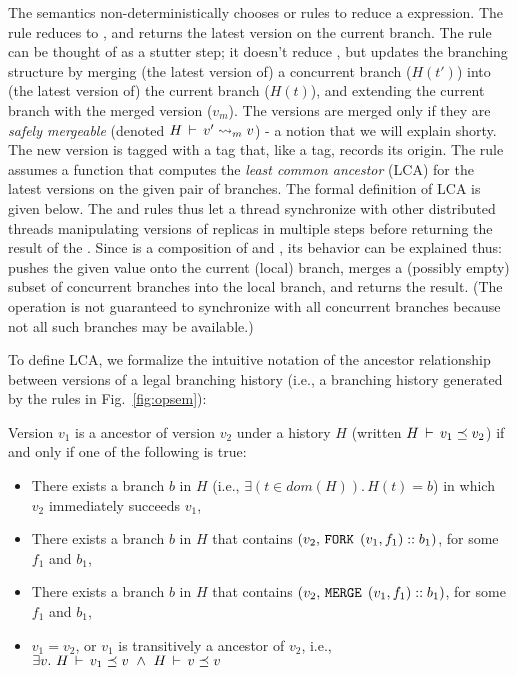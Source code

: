 The semantics non-deterministically chooses  or
 rules to reduce a  expression. The
 rule reduces  to \C{()}, and returns the
latest version on the current branch. The  rule
can be thought of as a stutter step; it doesn't reduce , but
updates the branching structure by merging (the latest version of) a
concurrent branch ($H(t')$) into (the latest version of) the current
branch ($H(t)$), and extending the current branch with the merged
version ($v_m$). The versions are merged only if they are \emph{safely
mergeable} (denoted $H\,\vdash\,v' \rightsquigarrow_m v$) - a notion that we will
explain shorty. The new version is tagged with a  tag that,
like a  tag, records its origin. The rule assumes a function
 that computes the \emph{least common ancestor} (LCA) for the
latest versions on the given pair of branches. The formal definition
of LCA is given below. The  and
 rules thus let a thread synchronize with other
distributed threads manipulating versions of replicas in multiple
steps before returning the result of the . Since  is a
composition of  and , its behavior can be explained
thus:  pushes the given value onto the current (local) branch,
merges a (possibly empty) subset of concurrent branches into the local
branch, and returns the result.  (The operation is not guaranteed to
synchronize with all concurrent branches because not all such branches
may be available.)

To define LCA, we formalize the intuitive notation of the ancestor
relationship between versions of a legal branching history (i.e., a
branching history generated by the rules in Fig.~\ref{fig:opsem}):

\begin{definition} 
Version $v_1$ is a ancestor of version $v_2$ under a history
$H$ (written $H\,\vdash\,v_1 \preceq v_2$) if and only if one of the
following is true:
\begin{itemize}
  \item There exists a branch $b$ in $H$ (i.e., $\exists(t\in
  dom(H)).\,H(t) = b$) in which $v_2$ immediately succeeds
  $v_1$,
  \item There exists a branch $b$ in $H$ that contains $(v_2, 
  \,{\tt FORK}\,\; (v_1,f_1)::b_1)$, for some $f_1$ and $b_1$,
  \item There exists a branch $b$ in $H$ that contains
  $(v_2, \,{\tt MERGE}\,\;(v_1,f_1)::b_1)$, for some $f_1$ and $b_1$,
  \item $v_1 = v_2$, or $v_1$ is transitively a ancestor of
  $v_2$, i.e., $\exists v.~ H\,\vdash\,v_1 \preceq v ~\wedge~
  H\,\vdash\,v \preceq v$ 
\end{itemize}
\end{definition}

